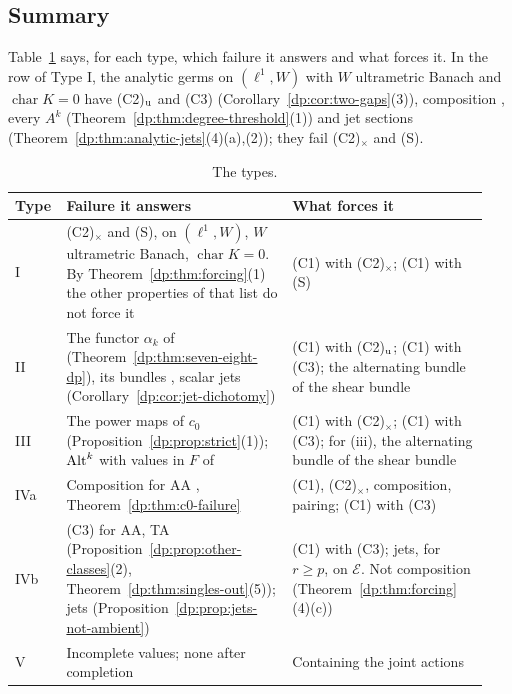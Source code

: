 \subsection{Summary}\label{dp:ssec:summary}

Table~\ref{dp:tab:types} says, for each type, which failure it answers and what forces it. In the row of Type I, the analytic germs on $(\ell^1,W)$ with $W$ ultrametric Banach and $\operatorname{char}K=0$ have (C2)$_{\rm u}$ and (C3) (Corollary~\ref{dp:cor:two-gaps}(3)), composition \cite[Proposition~14.26, proof, Step~1]{I}, every $A^k$ (Theorem~\ref{dp:thm:degree-threshold}(1)) and jet sections (Theorem~\ref{dp:thm:analytic-jets}(4)(a),(2)); they fail (C2)$_\times$ and (S).

\begin{table}[htbp]
\small
\caption{The types.}\label{dp:tab:types}
\begin{tabular}{@{}p{0.08\linewidth}p{0.46\linewidth}p{0.4\linewidth}@{}}
Type & Failure it answers & What forces it\\
\hline
I & (C2)$_\times$ and (S), on $(\ell^1,W)$, $W$ ultrametric Banach, $\operatorname{char}K=0$. By Theorem~\ref{dp:thm:forcing}(1) the other properties of that list do not force it & (C1) with (C2)$_\times$; (C1) with (S)\\
II & The functor $\alpha_k$ of~\cite[n\textsuperscript{o}~7.8.1]{Bou} (Theorem~\ref{dp:thm:seven-eight-dp}), its bundles \cite[Corollary~10.2]{I}, scalar jets (Corollary~\ref{dp:cor:jet-dichotomy}) & (C1) with (C2)$_{\rm u}$; (C1) with (C3); the alternating bundle of the shear bundle\\
III & The power maps of $c_0$ (Proposition~\ref{dp:prop:strict}(1)); $\operatorname{Alt}^k$ with values in $F$ of \cite[Theorem~7.2(1)]{I} & (C1) with (C2)$_\times$; (C1) with (C3); for (iii), the alternating bundle of the shear bundle\\
IVa & Composition for AA \cite[Theorem~14.17]{I}, Theorem~\ref{dp:thm:c0-failure} & (C1), (C2)$_\times$, composition, pairing; (C1) with (C3)\\
IVb & (C3) for AA, TA (Proposition~\ref{dp:prop:other-classes}(2), Theorem~\ref{dp:thm:singles-out}(5)); jets (Proposition~\ref{dp:prop:jets-not-ambient}) & (C1) with (C3); jets, for $r\ge p$, on $\mathcal E$. Not composition (Theorem~\ref{dp:thm:forcing}(4)(c))\\
V & Incomplete values; none after completion & Containing the joint actions\\
\end{tabular}
\end{table}

